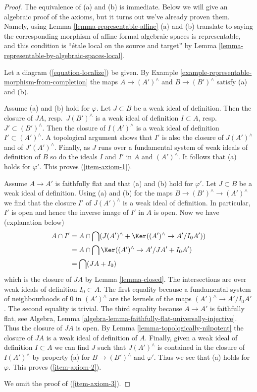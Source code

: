 \begin{proof}
The equivalence of (a) and (b) is immediate. Below we will give an
algebraic proof of the axioms, but it turns out we've already proven
them. Namely, using Lemma \ref{lemma-representable-affine}
(a) and (b) translate to saying the corresponding morphism of
affine formal algebraic spaces is representable, and this condition is
``\'etale local on the source and target'' by
Lemma \ref{lemma-representable-by-algebraic-spaces-local}.

\medskip\noindent
Let a diagram (\ref{equation-localize}) be given.
By Example \ref{example-representable-morphism-from-completion}
the maps $A \to (A')^\wedge$ and $B \to (B')^\wedge$
satisfy (a) and (b).

\medskip\noindent
Assume (a) and (b) hold for $\varphi$. Let $J \subset B$ be a weak ideal
of definition. Then the closure of $JA$, resp.\ $J(B')^\wedge$
is a weak ideal of definition $I \subset A$, resp.\ $J' \subset (B')^\wedge$.
Then the closure of $I(A')^\wedge$ is a weak ideal of definition
$I' \subset (A')^\wedge$. A topological argument shows that $I'$ is also
the closure of $J(A')^\wedge$ and of $J'(A')^\wedge$.
Finally, as $J$ runs over a fundamental system of weak ideals of definition
of $B$ so do the ideals $I$ and $I'$ in $A$ and $(A')^\wedge$.
It follows that (a) holds for $\varphi'$. This proves (\ref{item-axiom-1}).

\medskip\noindent
Assume $A \to A'$ is faithfully flat and that (a) and (b) hold for $\varphi'$.
Let $J \subset B$ be a weak ideal of definition. Using (a) and (b)
for the maps $B \to (B')^\wedge \to (A')^\wedge$ we find that the
closure $I'$ of $J(A')^\wedge$ is a weak ideal of definition.
In particular, $I'$ is open and hence the inverse image of $I'$
in $A$ is open. Now we have (explanation below)
\begin{align*}
A \cap I'
& =
A \cap \bigcap (J(A')^\wedge + \Ker((A')^\wedge \to A'/I_0A')) \\
& =
A \cap \bigcap \Ker((A')^\wedge \to A'/JA' + I_0 A') \\
& = \bigcap (JA + I_0)
\end{align*}
which is the closure of $JA$ by Lemma \ref{lemma-closed}.
The intersections are over weak ideals of definition $I_0 \subset A$.
The first equality because a fundamental system of neighbourhoods of
$0$ in $(A')^\wedge$ are the kernels of the maps $(A')^\wedge \to A'/I_0A'$.
The second equality is trivial. The third equality because $A \to A'$
is faithfully flat, see
Algebra, Lemma \ref{algebra-lemma-faithfully-flat-universally-injective}.
Thus the closure of $JA$ is open. By Lemma \ref{lemma-topologically-nilpotent}
the closure of $JA$
is a weak ideal of definition of $A$. Finally, given a weak
ideal of definition $I \subset A$ we can find $J$ such that
$J(A')^\wedge$ is contained in the closure of $I(A')^\wedge$
by property (a) for $B \to (B')^\wedge$ and $\varphi'$.
Thus we see that (a) holds for $\varphi$. This proves (\ref{item-axiom-2}).

\medskip\noindent
We omit the proof of (\ref{item-axiom-3}).
\end{proof}

